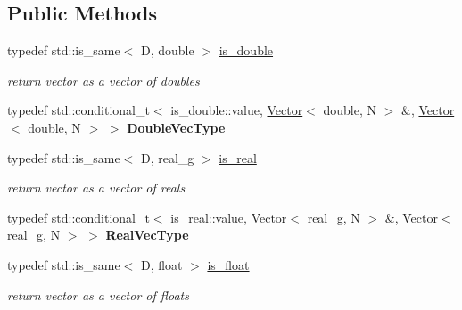 \subsection*{Public Methods}
\begin{DoxyCompactItemize}
\item 
\mbox{\label{classrev_1_1_vector_a02364ceb307d892c3127e729db702933}} 
typedef std\+::is\+\_\+same$<$ D, double $>$ \mbox{\hyperlink{classrev_1_1_vector_a02364ceb307d892c3127e729db702933}{is\+\_\+double}}
\begin{DoxyCompactList}\small\item\em return vector as a vector of doubles \end{DoxyCompactList}\item 
\mbox{\label{classrev_1_1_vector_a156913dbd5475608d80e523c42182cd1}} 
typedef std\+::conditional\+\_\+t$<$ is\+\_\+double\+::value, \mbox{\hyperlink{classrev_1_1_vector}{Vector}}$<$ double, N $>$ \&, \mbox{\hyperlink{classrev_1_1_vector}{Vector}}$<$ double, N $>$ $>$ {\bfseries Double\+Vec\+Type}
\item 
typedef std\+::is\+\_\+same$<$ D, real\+\_\+g $>$ \mbox{\hyperlink{classrev_1_1_vector_ac0b5c5c0f27e3365986497a0e01168f0}{is\+\_\+real}}
\begin{DoxyCompactList}\small\item\em return vector as a vector of reals \end{DoxyCompactList}\item 
\mbox{\label{classrev_1_1_vector_a222daf716e4aa48215a9d14fe4805e38}} 
typedef std\+::conditional\+\_\+t$<$ is\+\_\+real\+::value, \mbox{\hyperlink{classrev_1_1_vector}{Vector}}$<$ real\+\_\+g, N $>$ \&, \mbox{\hyperlink{classrev_1_1_vector}{Vector}}$<$ real\+\_\+g, N $>$ $>$ {\bfseries Real\+Vec\+Type}
\item 
\mbox{\label{classrev_1_1_vector_a129cd238bad6929c4e3816e301801b32}} 
typedef std\+::is\+\_\+same$<$ D, float $>$ \mbox{\hyperlink{classrev_1_1_vector_a129cd238bad6929c4e3816e301801b32}{is\+\_\+float}}
\begin{DoxyCompactList}\small\item\em return vector as a vector of floats \end{DoxyCompactList}\item 
\mbox{\label{classrev_1_1_vector_a4a3501ea3df7666ad912eebdc680efba}} 

\end{DoxyCompactItemize}
